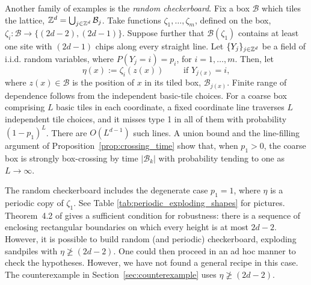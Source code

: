 \documentclass[12pt]{amsart}
\begin{document}
Another family of examples is the {\it random checkerboard}. Fix a box $\mathcal{B}$ which tiles the lattice, $\mathbb{Z}^d = \bigcup_{j \in \mathbb{Z}^d} \mathcal{B}_j$.  Take functions $\zeta_1, \ldots, \zeta_m$, defined on the box,  $\zeta_i: \mathcal{B} \to \{ (2 d - 2), (2 d - 1)\}$. Suppose further that $\mathcal{B}(\zeta_1)$ contains at least one site 
with $(2d-1)$ chips along every straight line.  Let $\{Y_j\}_{j \in \mathbb{Z}^d}$ be a field of i.i.d. random variables, where $P(Y_j = i) = p_i$, for $i = 1, \ldots, m$. 
Then, let 
\begin{equation} \label{eq:random_checkerboard}
\eta(x) := \zeta_i(z(x)) \qquad \mbox{ if $Y_{j(x)} = i$}, 
\end{equation}
where $z(x)  \in \mathcal{B}$ is the position of $x$ in its tiled box, $\mathcal{B}_{j(x)}$. 
Finite range of dependence follows from the independent basic-tile choices. For a coarse box comprising $L$ basic tiles in each coordinate, a fixed coordinate line traverses $L$ independent tile choices, and it misses type 1 in all of them with probability $(1-p_1)^L$. There are $O(L^{d-1})$ such lines. A union bound and the line-filling argument of Proposition~\ref{prop:crossing_time} show that, when $p_1>0$, the coarse box is strongly box-crossing by time $|\mathcal B_k|$ with probability tending to one as $L\to\infty$.


The random checkerboard includes the degenerate case $p_1 = 1$, where $\eta$ is a periodic copy of $\zeta_1$. 
See Table \ref{tab:periodic_exploding_shapes} for pictures. 
Theorem~4.2 of \cite{fey2010growth} gives a sufficient condition for robustness: there is a sequence of enclosing rectangular boundaries on which every height is at most $2d-2$. However, it is possible to build random (and periodic) checkerboard, exploding sandpiles with $\eta \not \geq (2 d - 2)$. One could then proceed in an ad hoc manner to check the hypotheses. However, we have not found a general recipe in this case. The counterexample in Section~\ref{sec:counterexample} uses $\eta \not \geq (2d - 2)$.
\end{document}

